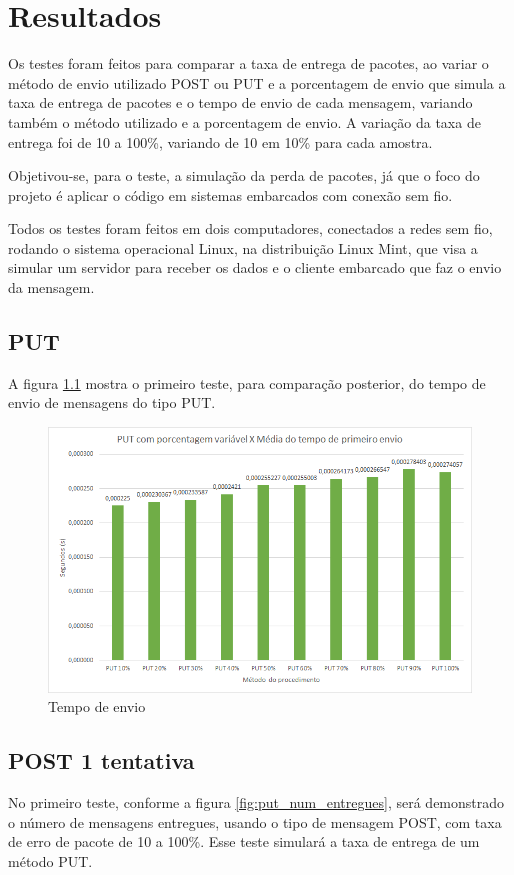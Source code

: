 \chapter{Resultados}

Os testes foram feitos para comparar a taxa de entrega de pacotes, ao variar o método de envio utilizado POST ou PUT e a porcentagem de envio que simula a taxa de entrega de pacotes e o tempo de envio de cada mensagem, variando também o método utilizado e a porcentagem de envio. A variação da taxa de entrega foi de 10 a 100\%, variando de 10 em 10\% para cada amostra.

Objetivou-se, para o teste, a simulação da perda de pacotes, já que o foco do projeto é aplicar o código em sistemas embarcados com conexão sem fio.

Todos os testes foram feitos em dois computadores, conectados a redes sem fio, rodando o sistema operacional Linux, na distribuição Linux Mint, que visa a simular um servidor para receber os dados e o cliente embarcado que faz o envio da mensagem.

\section{PUT}

A figura \ref{fig:put_tempo_envio} mostra o primeiro teste, para comparação posterior, do tempo de envio de mensagens do tipo PUT.

\begin{figure}[!htb]
	\centering
	\includegraphics[width=.8\textwidth]{../imagens/PUTxPrimeiroEnvio}
	\caption{Tempo de envio}
	\label{fig:put_tempo_envio}
\end{figure}

\section{POST 1 tentativa}
No primeiro teste, conforme a figura \ref{fig:put_num_entregues},
será demonstrado o número de mensagens entregues, usando o tipo de mensagem POST, com taxa de erro de pacote de 10 a 100\%.
Esse teste simulará a taxa de entrega de um método PUT.

